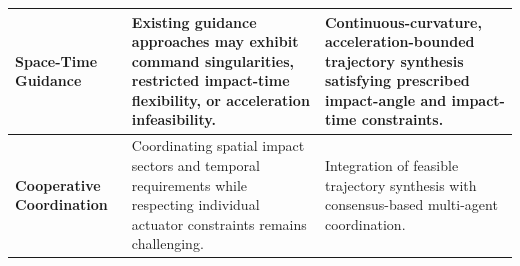 \begin{table}[ht!]
\begin{tabularx}{\textwidth}{
|>{\raggedright\arraybackslash}p{2.8cm}
|>{\raggedright\arraybackslash}X
|>{\raggedright\arraybackslash}X|}
\textbf{Space-Time Guidance} &
Existing guidance approaches may exhibit command singularities, restricted impact-time flexibility, or acceleration infeasibility. &
Continuous-curvature, acceleration-bounded trajectory synthesis satisfying prescribed impact-angle and impact-time constraints. \\ \hline

\textbf{Cooperative Coordination} &
Coordinating spatial impact sectors and temporal requirements while respecting individual actuator constraints remains challenging. & Integration of feasible trajectory synthesis with consensus-based multi-agent coordination. \\ \hline
\end{tabularx}
\end{table}



